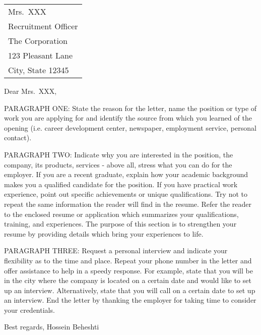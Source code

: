 \documentclass[localFont]{awesome-source-cv} %
\begin{document}
\makecvheader



\begin{tabular}{@{} l}
	Mrs.\ XXX           \\
	Recruitment Officer \\
	The Corporation     \\
	123 Pleasant Lane   \\
	City, State 12345
\end{tabular}

\bigskip %

Dear Mrs.\ XXX,

\bigskip %


PARAGRAPH ONE: State the reason for the letter, name the position or 
type of work you are applying for and identify the source from which 
you learned of the opening (i.e. career development center, newspaper, 
employment service, personal contact).

PARAGRAPH TWO: Indicate why you are interested in the position, the 
company, its products, services - above all, stress what you can do 
for the employer. If you are a recent graduate, explain how your 
academic background makes you a qualified candidate for the position. 
If you have practical work experience, point out specific achievements 
or unique qualifications. Try not to repeat the same information the 
reader will find in the resume. Refer the reader to the enclosed resume 
or application which summarizes your qualifications, training, and 
experiences. The purpose of this section is to strengthen your resume 
by providing details which bring your experiences to life.

PARAGRAPH THREE: Request a personal interview and indicate your 
flexibility as to the time and place. Repeat your phone number in 
the letter and offer assistance to help in a speedy response. For 
example, state that you will be in the city where the company is 
located on a certain date and would like to set up an interview. 
Alternatively, state that you will call on a certain date to set 
up an interview. End the letter by thanking the employer for 
taking time to consider your credentials.

\bigskip %
Best regards,
\vspace{50pt} %
Hossein Beheshti 
\end{document}
